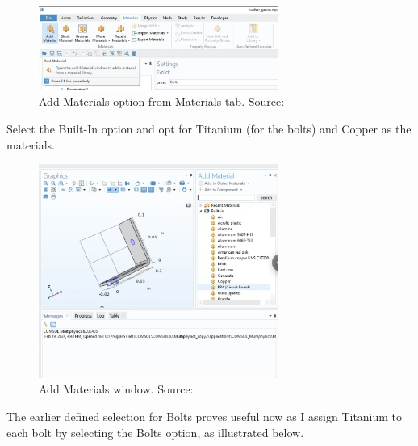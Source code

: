 \begin{figure}[H]
  \centering
  \includegraphics[width=0.7\textwidth]{Chapters/Figures/Chapter 3 Figures/Add Material Button.png}
  \caption{Add Materials option from Materials tab. Source: \cite{multiphysics__modeling_nodate}}
  \label{fig:Add Materials option from Materials tab.}
\end{figure}

Select the Built-In option and opt for Titanium (for the bolts) and Copper as the materials.

\begin{figure}[H]
  \centering
  \includegraphics[width=0.7\textwidth]{Chapters/Figures/Chapter 3 Figures/Add Material Window.png}
  \caption{Add Materials window. Source: \cite{multiphysics__modeling_nodate}}
  \label{fig:Add Materials window.}
\end{figure}

The earlier defined selection for Bolts proves useful now as I assign Titanium to each bolt by selecting the Bolts option, as illustrated below.

